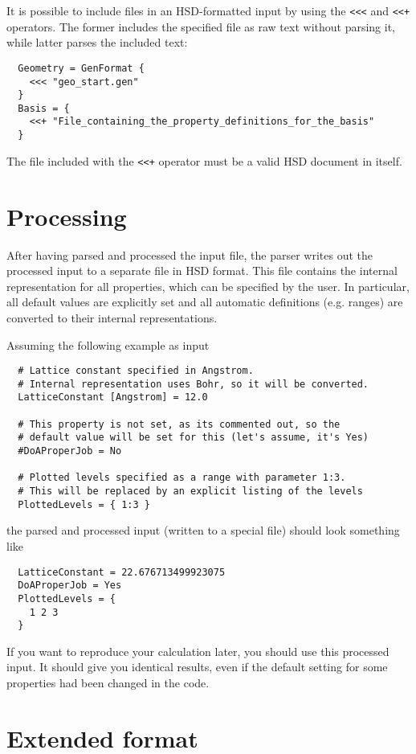 It is possible to include files in an HSD-formatted input by using the
\verb|<<<| and \verb|<<+| operators. The former includes the specified
file as raw text without parsing it, while latter parses the included
text:
\begin{verbatim}
  Geometry = GenFormat {
    <<< "geo_start.gen"
  }
  Basis = {
    <<+ "File_containing_the_property_definitions_for_the_basis"
  }
\end{verbatim}
The file included with the \verb|<<+| operator must be a valid HSD
document in itself.


\section{Processing}

After having parsed and processed the input file, the parser writes
out the processed input to a separate file in HSD format. This file
contains the internal representation for all properties, which can be
specified by the user. In particular, all default values are explicitly
set and all automatic definitions (e.g. ranges) are converted to their
internal representations.

Assuming the following example as input
\begin{verbatim}
  # Lattice constant specified in Angstrom.
  # Internal representation uses Bohr, so it will be converted.
  LatticeConstant [Angstrom] = 12.0

  # This property is not set, as its commented out, so the
  # default value will be set for this (let's assume, it's Yes)
  #DoAProperJob = No

  # Plotted levels specified as a range with parameter 1:3.
  # This will be replaced by an explicit listing of the levels
  PlottedLevels = { 1:3 }
\end{verbatim}
the parsed and processed input (written to a special file) should look
something like
\begin{verbatim}
  LatticeConstant = 22.676713499923075
  DoAProperJob = Yes
  PlottedLevels = {
    1 2 3
  }
\end{verbatim}
If you want to reproduce your calculation later, you should use this
processed input. It should give you identical results, even if the
default setting for some properties had been changed in the code.

\section{Extended format}
\label{sec:hsdext}

